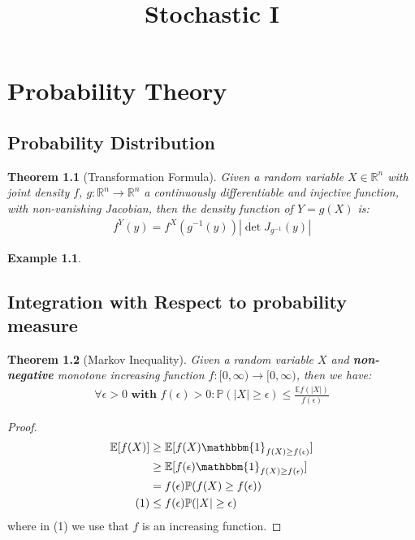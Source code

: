 \documentclass[a4paper,11pt]{book}
\newtheorem{theorem}{Theorem}[section]
\theoremstyle{definition}
\newtheorem*{example}{Example}
\theoremstyle{remark}
\begin{document}
\title{Stochastic I}

\chapter{Probability Theory}
\section{Probability Distribution}
\begin{theorem}[Transformation Formula]
Given a random variable $X \in \mathbb{R}^n$ with joint density $f$, $g: \mathbb{R}^n \rightarrow \mathbb{R}^n$ a continuously differentiable and injective function, with non-vanishing Jacobian, then the density function of $Y = g(X)$ is:
\begin{align*}
	f^Y(y) = f^X(g^{-1}(y)) |\det J_{g^{-1}}(y)|
\end{align*}
\end{theorem}

\begin{example}
\end{example}

\section{Integration with Respect to probability measure}
\begin{theorem}[Markov Inequality]
Given a random variable $X$ and \textbf{non-negative} monotone increasing function $f:[0, \infty) \rightarrow [0, \infty)$, then we have:
\begin{align*}
	\forall \epsilon > 0 \textbf{ with } f(\epsilon) > 0: \mathbb{P}(|X| \geq \epsilon) \leq \frac{\mathbb{E}f(|X|)}{f(\epsilon)}
\end{align*}
\end{theorem}
\begin{proof}
	\begin{align*}
		\mathbb{E}[f(X)] &\geq \mathbb{E}[f(X) \mathbbm{1}_{f(X) \geq f(\epsilon)}]\\
		&\geq \mathbb{E}[f(\epsilon)\mathbbm{1}_{f(X) \geq f(\epsilon)}]\\
		&= f(\epsilon) \mathbb{P}(f(X) \geq f(\epsilon))\\
	(1)	&\leq f(\epsilon)\mathbb{P}(|X| \geq \epsilon)
	\end{align*}
	where in (1) we use that $f$ is an increasing function.
\end{proof}
\end{document}
